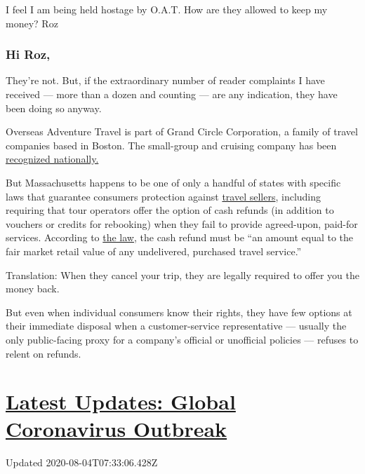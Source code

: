 I feel I am being held hostage by O.A.T. How are they allowed to keep my
money? Roz

\hypertarget{hi-roz}{%
\subsubsection{Hi Roz,}\label{hi-roz}}

They're not. But, if the extraordinary number of reader complaints I
have received --- more than a dozen and counting --- are any indication,
they have been doing so anyway.

Overseas Adventure Travel is part of Grand Circle Corporation, a family
of travel companies based in Boston. The small-group and cruising
company has been
\href{https://www.oattravel.com/oat-difference/awards}{recognized
nationally.}

But Massachusetts happens to be one of only a handful of states with
specific laws that guarantee consumers protection against
\href{https://www.mass.gov/doc/940-cmr-15-the-sale-of-travel-services/download}{travel
sellers}, including requiring that tour operators offer the option of
cash refunds (in addition to vouchers or credits for rebooking) when
they fail to provide agreed-upon, paid-for services. According to
\href{https://www.mass.gov/doc/940-cmr-15-the-sale-of-travel-services/download}{the
law,} the cash refund must be ``an amount equal to the fair market
retail value of any undelivered, purchased travel service.''

Translation: When they cancel your trip, they are legally required to
offer you the money back.

But even when individual consumers know their rights, they have few
options at their immediate disposal when a customer-service
representative --- usually the only public-facing proxy for a company's
official or unofficial policies --- refuses to relent on refunds.

\hypertarget{latest-updates-global-coronavirus-outbreak}{%
\section{\texorpdfstring{\href{https://www.nytimes.com/2020/08/03/world/coronavirus-covid-19.html?action=click\&pgtype=Article\&state=default\&region=MAIN_CONTENT_1\&context=storylines_live_updates}{Latest
Updates: Global Coronavirus
Outbreak}}{Latest Updates: Global Coronavirus Outbreak}}\label{latest-updates-global-coronavirus-outbreak}}

Updated 2020-08-04T07:33:06.428Z

